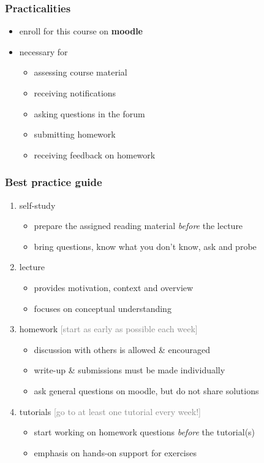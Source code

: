 \documentclass[fleqn,10pt,serif,xcolor=svgnames,xcolor=table,aspectratio=169,handout]{beamer}
\newcommand{\mycom}[1]{\hfill {\mygray{[#1]}}}
\newcommand{\mygray}[1]{\textcolor{gray}{#1}}
\begin{document}
\begin{frame}
  \frametitle{Practicalities}
  \begin{itemize}
    \item enroll for this course on \textbf{moodle}
    \item necessary for
    \begin{itemize}
      \item assessing course material
      \item receiving notifications
      \item asking questions in the forum
      \item submitting homework
      \item receiving feedback on homework
    \end{itemize}
  \end{itemize}
\end{frame}

\begin{frame}
  \frametitle{Best practice guide}
  \begin{enumerate}
    \item self-study
    \begin{itemize}
      \item prepare the assigned reading material \emph{before} the lecture
      \item bring questions, know what you don't know, ask and probe
    \end{itemize}
    \item lecture
    \begin{itemize}
      \item provides motivation, context and overview
      \item focuses on conceptual understanding
    \end{itemize}
    \item homework \hfill \mycom{start as early as possible each week}
    \begin{itemize}
      \item discussion with others is allowed \& encouraged
      \item write-up \& submissions must be made individually
      \item ask general questions on moodle, but do not share solutions
    \end{itemize}
    \item tutorials \hfill \mycom{go to at least one tutorial every week!}
    \begin{itemize}
      \item start working on homework questions \emph{before} the tutorial(s)
      \item emphasis on hands-on support for exercises
    \end{itemize}
  \end{enumerate}
\end{frame}
\end{document}

